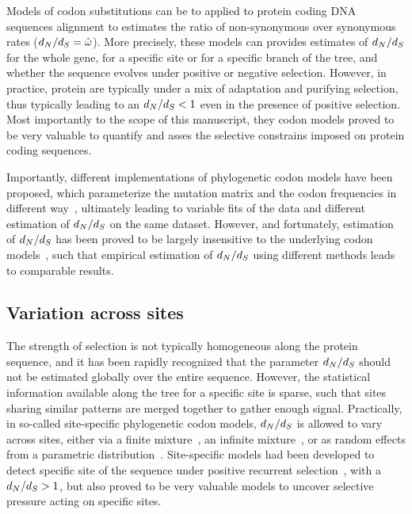Models of \gls{codon} \glspl{substitution} can be to applied to protein coding \acrshort{DNA} sequences alignment to estimates the ratio of non-synonymous over \gls{synonymous} rates ($d_N / d_S=\hat{\omega}$).
More precisely, these models can provides estimates of $d_N / d_S$ for the whole gene, for a specific site or for a specific branch of the tree, and whether the sequence evolves under positive or negative selection.
However, in practice, protein are typically under a mix of adaptation and purifying selection, thus typically leading to an $d_N / d_S<1$ even in the presence of positive selection.
Most importantly to the scope of this manuscript, they \gls{codon} models proved to be very valuable to quantify and asses the selective constrains imposed on protein coding sequences.

Importantly, different implementations of phylogenetic \gls{codon} models have been proposed, which parameterize the mutation matrix and the \gls{codon} frequencies in different way~\citep{Muse1994, Goldman1994}, ultimately leading to variable fits of the data and different estimation of $d_N / d_S$ on the same dataset.
However, and fortunately, estimation of $d_N / d_S$ has been proved to be largely insensitive to the underlying \gls{codon} models~\citep{Spielman2018}, such that empirical estimation of $d_N / d_S$ using different methods leads to comparable results.

\subsection{Variation across sites}

The strength of selection is not typically homogeneous along the protein sequence, and it has been rapidly recognized that the parameter $d_N / d_S$ should not be estimated globally over the entire sequence.
However, the statistical information available along the tree for a specific site is sparse, such that sites sharing similar patterns are merged together to gather enough signal.
Practically, in so-called site-specific phylogenetic \gls{codon} models, $d_N / d_S$ is allowed to vary across sites, either via a finite mixture~\citep{Nielsen1998, Yang2000, Yang2005}, an infinite mixture~\citep{Huelsenbeck2006}, or as random effects from a parametric distribution~\citep{Lartillot2013}.
Site-specific models had been developed to detect specific site of the sequence under positive recurrent selection~\citep{kosiol_patterns_2008}, with a $d_N / d_S>1$, but also proved to be very valuable models to uncover selective pressure acting on specific sites.

